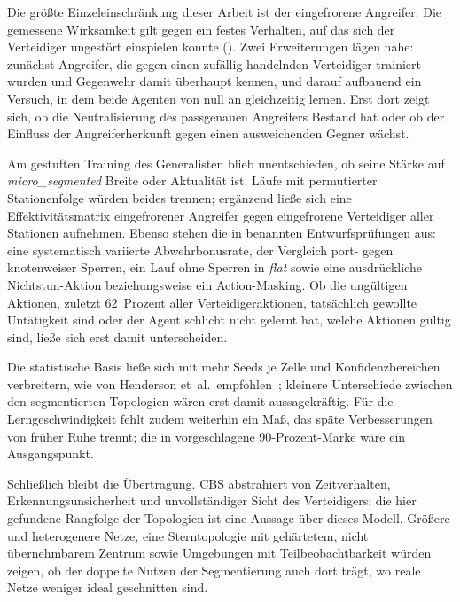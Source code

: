 Die größte Einzeleinschränkung dieser Arbeit ist der eingefrorene
Angreifer: Die gemessene Wirksamkeit gilt gegen ein festes Verhalten, auf
das sich der Verteidiger ungestört einspielen konnte
(). Zwei Erweiterungen lägen nahe: zunächst
Angreifer, die gegen einen zufällig handelnden Verteidiger trainiert
wurden und Gegenwehr damit überhaupt kennen, und darauf aufbauend ein
Versuch, in dem beide Agenten von null an gleichzeitig lernen. Erst dort
zeigt sich, ob die Neutralisierung des passgenauen Angreifers Bestand hat
oder ob der Einfluss der Angreiferherkunft gegen einen ausweichenden
Gegner wächst.

Am gestuften Training des Generalisten blieb unentschieden, ob seine
Stärke auf \emph{micro\_segmented} Breite oder Aktualität ist. Läufe mit
permutierter Stationenfolge würden beides trennen; ergänzend ließe sich
eine Effektivitätsmatrix eingefrorener Angreifer gegen eingefrorene
Verteidiger aller Stationen aufnehmen. Ebenso stehen die in
 benannten Entwurfsprüfungen aus: eine systematisch
variierte Abwehrbonusrate, der Vergleich port- gegen knotenweiser Sperren,
ein Lauf ohne Sperren in \emph{flat} sowie eine ausdrückliche
Nichtstun-Aktion beziehungsweise ein Action-Masking. Ob die ungültigen
Aktionen, zuletzt 62~Prozent aller Verteidigeraktionen, tatsächlich
gewollte Untätigkeit sind oder der Agent schlicht nicht gelernt hat,
welche Aktionen gültig sind, ließe sich erst damit unterscheiden.

Die statistische Basis ließe sich mit mehr Seeds je Zelle und
Konfidenzbereichen verbreitern, wie von Henderson et~al.\
empfohlen~\cite{henderson2019deepreinforcementlearningmatters}; kleinere
Unterschiede zwischen den segmentierten Topologien wären erst damit
aussagekräftig. Für die Lerngeschwindigkeit fehlt zudem weiterhin ein
Maß, das späte Verbesserungen von früher Ruhe trennt; die in
 vorgeschlagene 90-Prozent-Marke wäre ein
Ausgangspunkt.

Schließlich bleibt die Übertragung. \ac{CBS} abstrahiert von
Zeitverhalten, Erkennungsunsicherheit und unvollständiger Sicht des
Verteidigers; die hier gefundene Rangfolge der Topologien ist eine Aussage
über dieses Modell. Größere und heterogenere Netze, eine Sterntopologie
mit gehärtetem, nicht übernehmbarem Zentrum sowie Umgebungen mit
Teilbeobachtbarkeit würden zeigen, ob der doppelte Nutzen der
Segmentierung auch dort trägt, wo reale Netze weniger ideal geschnitten
sind.
